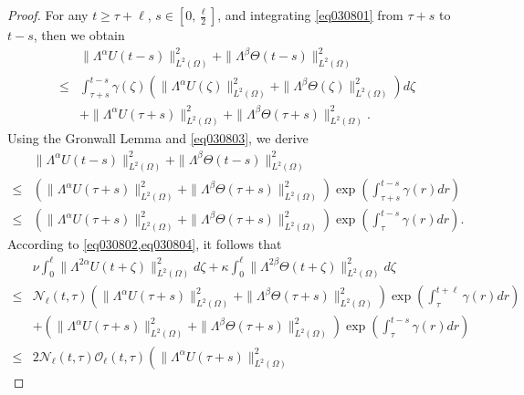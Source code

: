 \documentclass[oneside,preprint,12pt,numbers,sort&compress]{elsarticle}
\begin{document}
\begin{proof}
For any $t \geq \tau + \ell$, $s\in [0,\frac{\ell}{2}]$, and integrating \cref{eq030801} from $\tau+s$ to $t-s$, then we obtain
\begin{equation}\label{eq030803}
\begin{aligned}
& \| \Lambda^{\alpha}U(t-s) \|_{L^2(\Omega)}^{2} 
+ \| \Lambda^{\beta}\Theta (t-s) \|_{L^2(\Omega)}^{2} 
\\
\leq
& \int_{\tau+s}^{t-s}
\gamma(\zeta)
\left( 
\| \Lambda^{\alpha}U(\zeta) \|_{L^2(\Omega)}^{2} + \| \Lambda^{\beta}\Theta(\zeta) \|_{L^2(\Omega)}^{2} 
\right) d\zeta \\
&
+ \| \Lambda^{\alpha}U(\tau+s) \|_{L^2(\Omega)}^{2} 
+ \| \Lambda^{\beta}\Theta (\tau+s) \|_{L^2(\Omega)}^{2}.
\end{aligned}
\end{equation}
Using the Gronwall Lemma and \cref{eq030803}, we derive
\begin{equation}\label{eq030804}
\begin{aligned}
& \| \Lambda^{\alpha}U(t-s) \|_{L^2(\Omega)}^{2} 
+ \| \Lambda^{\beta}\Theta (t-s) \|_{L^2(\Omega)}^{2} \\
\leq
& 
\left( \| \Lambda^{\alpha}U(\tau+s) \|_{L^2(\Omega)}^{2} 
+ \| \Lambda^{\beta}\Theta (\tau+s) \|_{L^2(\Omega)}^{2} \right)
\exp \left(\int_{\tau+s}^{t-s}
\gamma(r) dr \right) \\
\leq
& 
\left( \| \Lambda^{\alpha}U(\tau+s) \|_{L^2(\Omega)}^{2} 
+ \| \Lambda^{\beta}\Theta (\tau+s) \|_{L^2(\Omega)}^{2} \right)
\exp \left(\int_{\tau}^{t-s}
\gamma(r) dr \right).
\end{aligned}
\end{equation}
According to \cref{eq030802,eq030804}, it follows that
\begin{equation}\label{eq030805}
\begin{aligned}
&
\nu \int_{0}^{\ell} \| \Lambda^{2\alpha} U(t+\zeta) \|_{L^2(\Omega)}^{2} d\zeta
+\kappa \int_{0}^{\ell} \| \Lambda^{2\beta} \Theta (t+\zeta) \|_{L^2(\Omega)}^{2} d\zeta
\\
\leq
& \mathcal{N}_{\ell}(t,\tau) \left( \| \Lambda^{\alpha}U(\tau+s) \|_{L^2(\Omega)}^{2} 
+ \| \Lambda^{\beta}\Theta (\tau+s) \|_{L^2(\Omega)}^{2} \right)
\exp \left(\int_{\tau}^{t+\ell}
\gamma(r) dr \right) \\
&+ \left( \| \Lambda^{\alpha}U(\tau+s) \|_{L^2(\Omega)}^{2} 
+ \| \Lambda^{\beta}\Theta (\tau+s) \|_{L^2(\Omega)}^{2} \right)
\exp \left(\int_{\tau}^{t-s}
\gamma(r) dr \right)\\
\leq
& 2 \mathcal{N}_{\ell}(t,\tau) \mathcal{O}_{\ell}(t,\tau) \left( \| \Lambda^{\alpha}U(\tau+s) \|_{L^2(\Omega)}^{2} 

\end{aligned}
\end{equation}
\end{proof}
\end{document}
